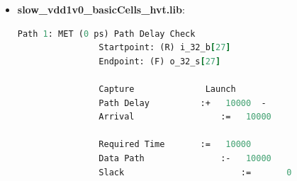 \begin{enumerate}[label=\arabic*.]
\begin{itemize}
\begin{lstlisting}[style=StyleResult, language=TCL, caption={Timing Report Using slow\_vdd1v0\_basicCells\_lvt.lib (Worst-Case Corner).}]
				Capture   			 Launch  
				Path Delay			:+    4500	-  
				Arrival					:=    4500            
				
				Required Time		:=    4500            
				Data Path				:-    4500            
				Slack						:=       0             
			\end{lstlisting}
			
			\begin{lstlisting}[style=StyleCode, language=TCL, caption={Delay .sdf file Using slow\_vdd1v0\_basicCells\_lvt.lib (\href{https://github.com/Noname-29-lnin/Floating_point/blob/main/Version_Final2/05_synth/Genus/slow_vdd1v0_basicCells_lvt/FPU_unit.sdf}{This link}).}]
				(DELAYFILE
					(SDFVERSION  "OVI 3.0")
					(DESIGN      "FPU_unit")
					(DATE        "Sun Nov 23 21:17:47 -0500 2025")
					(VENDOR      "Cadence, Inc.")
					(PROGRAM     "Genus(TM) Synthesis Solution")
					(VERSION     "GENUS15.20 - 15.20-p004_1")
					(DIVIDER     .)
					(VOLTAGE     ::0.899999)
					(PROCESS     "::1.0")
					(TEMPERATURE ::125.0)
					(TIMESCALE   1ns)
					(CELL
						(CELLTYPE "OAI21X1LVT")
						(INSTANCE EXP_ADJUST_UNIT.CLA_8BIT_UNIT.CLA_4BIT_UNIT_0.g307)
						(DELAY
							(ABSOLUTE
								(PORT A0 (::0.000))
								(PORT A1 (::0.000))
								(PORT B0 (::0.000))
								(IOPATH A0 Y (::0.050) (::0.057))
								(IOPATH B0 Y (::0.035) (::0.048))
								(IOPATH A1 Y (::0.058) (::0.054))
							)
						)
					)
				...
				  (CELL
					(CELLTYPE "INVX1LVT")
						(INSTANCE g44)
						(DELAY
							(ABSOLUTE
								(PORT A (::0.000))
								(IOPATH A Y (::0.035) (::0.034))
							)
						)
					)
				)
			\end{lstlisting}
			
			\item \textbf{slow\_vdd1v0\_basicCells\_hvt.lib}:
			\begin{lstlisting}[style=StyleResult, language=TCL, caption={Timing Report Using slow\_vdd1v0\_basicCells\_hvt.lib (Worst-Case Corner).}]
				Path 1: MET (0 ps) Path Delay Check
				Startpoint: (R) i_32_b[27]
				Endpoint: (F) o_32_s[27]
				
				Capture   			 Launch  
				Path Delay			:+   10000	-  
				Arrival					:=   10000            
				
				Required Time		:=   10000            
				Data Path				:-   10000            
				Slack						:=       0            
			\end{lstlisting}
		

\end{itemize}
\end{enumerate}
